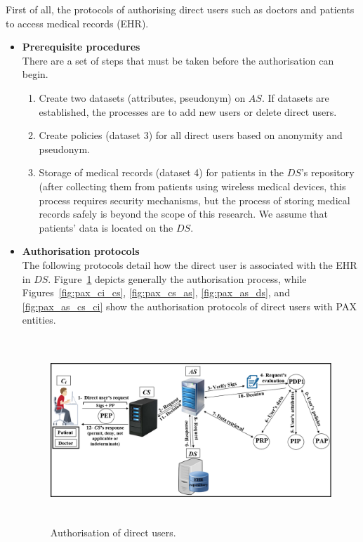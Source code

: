 \documentclass[journal,article,submit,moreauthors,pdftex]{Definitions/mdpi}
\begin{document}
\begin{itemize}
\begin{itemize}[topsep=0pt,itemsep=-1ex,partopsep=1ex,parsep=1ex]
First of all, the protocols of authorising direct users such as doctors and patients to access medical records (EHR).
\begin{itemize} [topsep=0pt,itemsep=-1ex,partopsep=1ex,parsep=1ex]
\item \textbf{Prerequisite procedures}\\
There are a set of steps that must be taken before the authorisation can begin.
\begin{enumerate}[topsep=0pt,itemsep=-1ex,partopsep=1ex,parsep=1ex]
\item Create two datasets  (attributes, pseudonym) on $AS$. If datasets are established, the processes are to add new users or delete direct users.
\item Create policies (dataset 3) for all direct users based on anonymity and pseudonym.
\item Storage of medical records (dataset 4) for patients in the $DS$'s repository (after collecting them from patients using wireless medical devices, this process requires security mechanisms, but the process of storing medical records safely is beyond the scope of this research. We assume that patients' data is located on the $DS$.
\end{enumerate}
\item \textbf{Authorisation protocols}\\
The following protocols detail how the direct user is associated with the EHR in $DS$. Figure~\ref{fig:directuser} depicts generally the authorisation process, while Figures~\ref{fig:pax_ci_cs}, \ref{fig:pax_cs_as}, \ref{fig:pax_as_ds}, and \ref{fig:pax_as_cs_ci} show the authorisation protocols of direct users with PAX entities.
\begin{figure}[ht!]
\centering
  \includegraphics[width=14cm,height=7cm]{directuser.png}
	\caption{Authorisation of direct users.}
	\label{fig:directuser}
\end{figure}
\begin{enumerate}


\end{enumerate}
\end{itemize}
\end{itemize}
\end{itemize}
\end{document}

